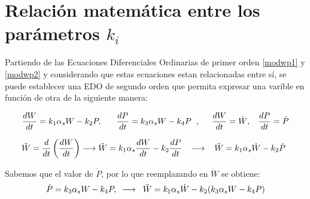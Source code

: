 
\section{Relación matemática entre los parámetros $k_{i}$}\label{demostralabel}

Partiendo de las Ecuaciones Diferenciales Ordinarias de primer orden \ref{modwp1} y \ref{modwp2} y considerando que estas ecuaciones estan relacionadas entre sí, se puede establecer una EDO de segundo orden que permita expresar una varible en función de otra de la siguiente manera:

\begin{equation*}
    \frac{dW}{dt} = k_{1}\alpha_{s}W - k_{2}P, \hspace{0.6cm} \frac{dP}{dt} = k_{3}\alpha_{s}W - k_{4}P \hspace{0.2cm}, \hspace{0.3cm} \hspace{0.2cm} \frac{dW}{dt} = \dot{W}, \hspace{0.3cm} \frac{dP}{dt} = \dot{P}
\end{equation*}


\begin{equation*}
    \ddot{W} = \frac{d}{dt}\left(\frac{dW}{dt}\right) \longrightarrow \ddot{W} = k_{1}\alpha_{s}\frac{dW}{dt} - k_{2}\frac{dP}{dt} \hspace{0.3cm} \longrightarrow \hspace{0.3cm} \ddot{W} = k_{1}\alpha_{s}\dot{W} - k_{2}\dot{P}\hspace{0.15cm}
\end{equation*}

Sabemos que el valor de $\dot{P}$, por lo que reemplazando en $\ddot{W}$ se obtiene:
\begin{equation*}
    \dot{P} = k_{3}\alpha_{s}W - k_{4}P, \hspace{0.2cm}\longrightarrow\hspace{0.2cm} \ddot{W} = k_{1}\alpha_{s}\dot{W} - k_{2}(k_{3}\alpha_{s}W - k_{4}P)
\end{equation*}

